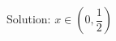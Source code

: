 \documentclass[preview]{standalone}
\begin{document}
\begin{center}
Solution: $x \in \left(0, \dfrac{1}{2}\right)$
\end{center}
\end{document}
